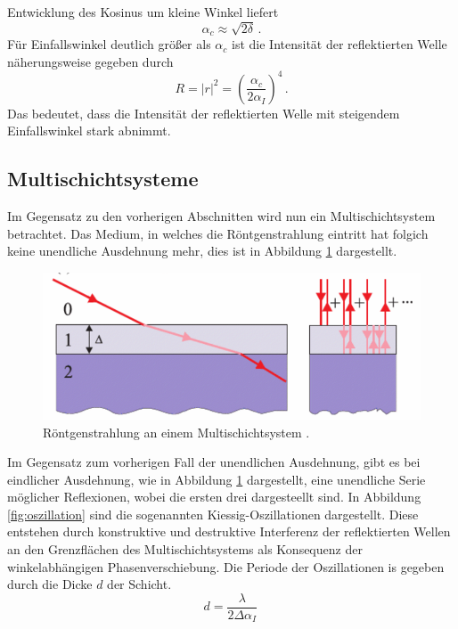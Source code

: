 Entwicklung des Kosinus um kleine Winkel liefert
\begin{equation}
    \alpha_c \approx \sqrt{2 \delta} \, .
    \label{eq:alpha_c}
\end{equation}
Für Einfallswinkel deutlich größer als $\alpha_c$ ist die Intensität der reflektierten Welle näherungsweise gegeben durch
\begin{equation}
    R = |r|^2 = \left(\frac{\alpha_c}{2 \alpha_I} \right)^4 \, .
    \label{eq:reflektivität_R}
\end{equation}
Das bedeutet, dass die Intensität der reflektierten Welle mit steigendem Einfallswinkel stark abnimmt.

\subsection{Multischichtsysteme} \label{sec:multischicht}
Im Gegensatz zu den vorherigen Abschnitten wird nun ein Multischichtsystem betrachtet.
Das Medium, in welches die Röntgenstrahlung eintritt hat folgich keine unendliche Ausdehnung mehr, 
dies ist in Abbildung \ref{fig:multischicht} dargestellt.
\begin{figure}[H]
    \centering
    \includegraphics[scale=0.5]{Bilder/multischicht.png}
    \caption{Röntgenstrahlung an einem Multischichtsystem \cite{als-nielsen2011}.}
    \label{fig:multischicht}
\end{figure}
Im Gegensatz zum vorherigen Fall der unendlichen Ausdehnung, gibt es bei eindlicher Ausdehnung, 
wie in Abbildung \ref{fig:multischicht} dargestellt, 
eine unendliche Serie möglicher Reflexionen, wobei die ersten drei dargesteellt sind.
In Abbildung \ref{fig:oszillation} sind die sogenannten Kiessig-Oszillationen dargestellt.
Diese entstehen durch konstruktive und destruktive Interferenz der reflektierten Wellen an den Grenzflächen des Multischichtsystems als Konsequenz der winkelabhängigen Phasenverschiebung.
Die Periode der Oszillationen is gegeben durch die Dicke $d$ der Schicht.
\begin{equation}
    d = \frac{\lambda}{2 \Delta \alpha_I} \, 
    \label{eq:dicke}
\end{equation}
